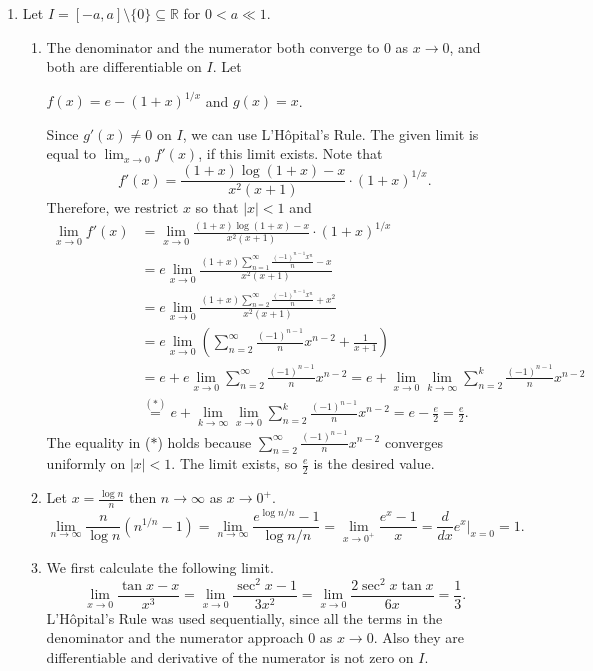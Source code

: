 \documentclass[12pt]{report}
\newcommand{\numl}[1]{\item[\large\textbf{\sffamily #1.}]}
\newcommand{\num}[1]{\item[\textbf{\sffamily #1}]}
\newcommand{\ds}{\displaystyle}
\newcommand{\bs}{\setminus}
\renewcommand{\subset}{\subseteq}
\newcommand{\abs}[1]{\left| #1 \right|}
\newcommand{\ra}{\rightarrow}
\newcommand{\mast}{\(\ast\)}
\newcommand{\R}{\mathbb{R}}
\begin{document}
\begin{enumerate}
    \numl{4} Let \(I = [-a, a] \bs \{0\} \subset \R\) for \(0 < a \ll 1\).
    \begin{enumerate}
        \num{(a)} The denominator and the numerator both converge to \(0\) as \(x \ra 0\), and both are differentiable on \(I\). Let
        \begin{center}
            \(f(x) = \ds e - (1+x)^{1/x}\) \quad and \quad \(g(x) = x\).
        \end{center}
        Since \(g'(x) \neq 0\) on \(I\), we can use L'H\^opital's Rule. The given limit is equal to \(\ds \lim_{x \ra 0} f'(x)\), if this limit exists. Note that
        \[
            f'(x) = \frac{(1+x)\log(1+x) - x}{x^2(x+1)}\cdot (1+x)^{1/x}.
        \]
        Therefore, we restrict \(x\) so that \(\abs{x} < 1\) and
        \[
            \begin{aligned}
                \lim_{x \ra 0} f'(x) & = \lim_{x \ra 0} \frac{(1+x)\log(1+x) - x}{x^2(x+1)}\cdot (1+x)^{1/x}                                                                                  \\
                                     & = e\lim_{x \ra 0} \frac{(1+x) \sum_{n=1}^\infty \frac{(-1)^{n-1} x^n}{n} - x}{x^2(x+1)}                                                                \\
                                     & = e\lim_{x \ra 0} \frac{(1+x) \sum_{n=2}^\infty \frac{(-1)^{n-1} x^n}{n} + x^2}{x^2(x+1)}                                                              \\
                                     & = e\lim_{x \ra 0} \left(\sum_{n=2}^\infty \frac{(-1)^{n-1}}{n}x^{n-2} + \frac{1}{x+1}\right)                                                           \\
                                     & = e + e \lim_{x \ra 0} \sum_{n=2}^\infty \frac{(-1)^{n-1}}{n}x^{n-2} = e + \lim_{x \ra 0} \lim_{k \ra \infty} \sum_{n=2}^k \frac{(-1)^{n-1}}{n}x^{n-2} \\
                                     & \overset{(\ast)}{=} e + \lim_{k \ra \infty} \lim_{x \ra 0}\sum_{n=2}^k \frac{(-1)^{n-1}}{n}x^{n-2} = e - \frac{e}{2} = \frac{e}{2}.
            \end{aligned}
        \]
        The equality in (\mast) holds because \(\sum_{n=2}^\infty \frac{(-1)^{n-1}}{n}x^{n-2}\) converges uniformly on \(\abs{x} < 1\). The limit exists, so \(\frac{e}{2}\) is the desired value.
        \num{(b)} Let \(x = \frac{\log n}{n}\) then \(n \ra \infty\) as \(x \ra 0^+\).
        \[
            \lim_{n \ra \infty} \frac{n}{\log n}(n^{1/n} - 1) = \lim_{n \ra \infty} \frac{e^{\log n/n} - 1}{\log n / n} = \lim_{x \ra 0^+} \frac{e^x - 1}{x} = \frac{d}{dx} e^x \bigg|_{x = 0} = 1.
        \]
        \num{(c)} We first calculate the following limit.
        \[
            \lim_{x \ra 0} \frac{\tan x - x}{x^3} = \lim_{x \ra 0} \frac{\sec^2 x - 1}{3x^2} = \lim_{x \ra 0} \frac{2\sec^2 x \tan x}{6x} = \frac{1}{3}.
        \]
        L'H\^opital's Rule was used sequentially, since all the terms in the denominator and the numerator approach \(0\) as \(x \ra 0\). Also they are differentiable and derivative of the numerator is not zero on \(I\).


\end{enumerate}
\end{enumerate}
\end{document}
